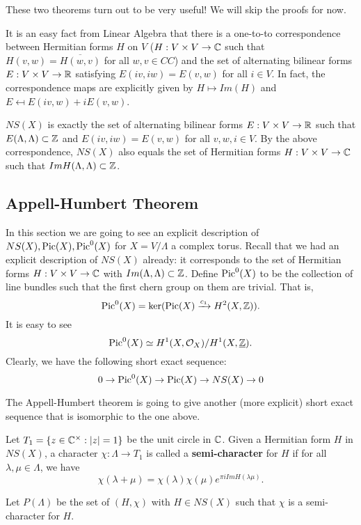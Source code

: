 These two theorems turn out to be very useful! We will skip the proofs for now. 

It is an easy fact from Linear Algebra that there is a one-to-to correspondence between Hermitian forms $H$ on $V$ ($H:V\times V\to {\mathbb C}$ such that $H(v,w)=\overline{H(w,v)}$ for all $w,v\in CC$) and the set of alternating bilinear forms $E:V\times V\to {\mathbb R}$ satisfying $E(iv,iw)=E(v,w)$ for all $i\in V$. In fact, the correspondence maps are explicitly given by 
$H\mapsto Im(H)$
and 
$E\mapsfrom E(iv,w)+iE(v,w)$. 

\begin{corollary}
$NS(X)$ is exactly the set of alternating bilinear forms $E: V\times V\to {\mathbb R}$ such that $E(\Lambda,\Lambda)\subset {\mathbb Z}$ and $E(iv,iw)=E(v,w)$ for all $v,w,i\in V$. By the above correspondence, $NS(X)$ also equals the set of Hermitian forms $H:V\times V\to {\mathbb C}$ such that $Im H(\Lambda,\Lambda)\subset {\mathbb Z}$. 
\end{corollary}


\subsection{Appell-Humbert Theorem}

In this section we are going to see an explicit description of $NS(X),\operatorname{Pic}(X),\operatorname{Pic}^0(X)$ for $X=V/\Lambda$ a complex torus. Recall that we had an explicit description of $NS(X)$ already: it corresponds to the set of Hermitian forms $H:V\times V\to {\mathbb C}$ with $Im(\Lambda,\Lambda)\subset {\mathbb Z}$. Define $\operatorname{Pic}^0(X)$ to be the collection of line bundles such that the first chern group on them are trivial. That is, 
$$\operatorname{Pic}^0(X)=\ker(\operatorname{Pic}(X) \xrightarrow{c_1} H^2(X,{\mathbb Z})).$$
It is easy to see 
$$\operatorname{Pic}^0(X) \simeq  H^1(X,\mathcal{O}_X) / H^1(X,\underline{{\mathbb Z}}).$$
Clearly, we have the following short exact sequence:
$$0\to \operatorname{Pic}^0(X)\to \operatorname{Pic}(X)\to NS(X)\to 0$$

The Appell-Humbert theorem is going to give another (more explicit) short exact sequence that is isomorphic to the one above. 


Let $T_1=\{z\in {\mathbb C}^\times: |z|=1\}$ be the unit circle in ${\mathbb C}$. Given a Hermitian form $H$ in $NS(X)$, a character $\chi:\Lambda\to T_1$ is called a \textbf{semi-character} for $H$ if for all $\lambda,\mu\in \Lambda$, we have
$$\chi(\lambda+\mu)=\chi(\lambda)\chi(\mu)e^{\pi i Im H(\lambda\mu)}.$$

Let $P(\Lambda)$ be the set of $(H,\chi)$ with $H\in NS(X)$ such that $\chi$ is a semi-character for $H$.

